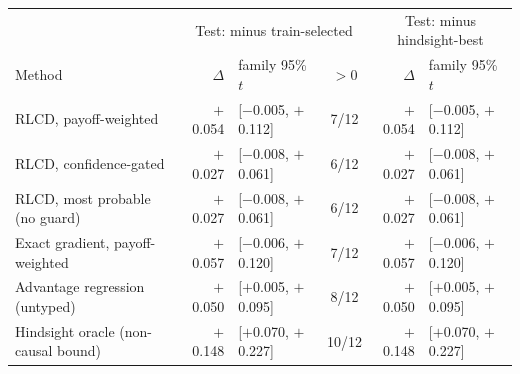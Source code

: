 \begin{tabular}{lrlcrl}
\toprule
 & \multicolumn{3}{c}{Test: minus train-selected} & \multicolumn{2}{c}{Test: minus hindsight-best} \\
Method & $\Delta$ & family 95\% $t$ & $>0$ & $\Delta$ & family 95\% $t$ \\
\midrule
RLCD, payoff-weighted & $+$0.054 & [$-$0.005, $+$0.112] & 7/12 & $+$0.054 & [$-$0.005, $+$0.112] \\
RLCD, confidence-gated & $+$0.027 & [$-$0.008, $+$0.061] & 6/12 & $+$0.027 & [$-$0.008, $+$0.061] \\
RLCD, most probable (no guard) & $+$0.027 & [$-$0.008, $+$0.061] & 6/12 & $+$0.027 & [$-$0.008, $+$0.061] \\
Exact gradient, payoff-weighted & $+$0.057 & [$-$0.006, $+$0.120] & 7/12 & $+$0.057 & [$-$0.006, $+$0.120] \\
Advantage regression (untyped) & $+$0.050 & [$+$0.005, $+$0.095] & 8/12 & $+$0.050 & [$+$0.005, $+$0.095] \\
Hindsight oracle (non-causal bound) & $+$0.148 & [$+$0.070, $+$0.227] & 10/12 & $+$0.148 & [$+$0.070, $+$0.227] \\
\bottomrule
\end{tabular}

